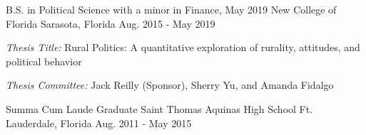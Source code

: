 

\begin{cventries}

  \cventry
    {B.S. in Political Science with a minor in Finance, May 2019} %
    {New College of Florida} %
    {Sarasota, Florida} %
    {Aug. 2015 - May 2019} %
    {
    \begin{cvitems}
      \item \emph{Thesis Title:} Rural Politics: A quantitative exploration of rurality, attitudes, and political behavior
      \item \emph{Thesis Committee:} Jack Reilly (Sponsor), Sherry Yu, and Amanda Fidalgo
    \end{cvitems}
  }


  \cventry
    {Summa Cum Laude Graduate} %
    {Saint Thomas Aquinas High School} %
    {Ft. Lauderdale, Florida} %
    {Aug. 2011 - May 2015} %
    {}

\vspace{-.25cm}




\end{cventries}
